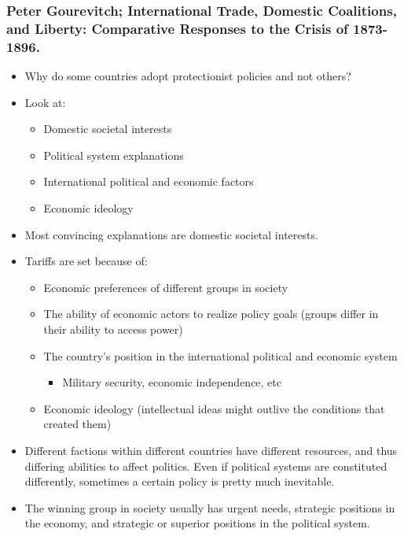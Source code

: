 \documentclass[11pt]{article}
\begin{document}
\subsubsection{Peter Gourevitch; International Trade, Domestic Coalitions, and Liberty:  Comparative Responses to the Crisis of 1873-1896.}
\label{sec:org9d85f0e}
\begin{itemize}
\item Why do some countries adopt protectionist policies and not others?
\item Look at:
\begin{itemize}
\item Domestic societal interests
\item Political system explanations
\item International political and economic factors
\item Economic ideology
\end{itemize}
\item Most convincing explanations are domestic societal interests.
\item Tariffs are set because of:
\begin{itemize}
\item Economic preferences of different groups in society
\item The ability of economic actors to realize policy goals (groups differ in
their ability to access power)
\item The country's position in the international political and economic system
\begin{itemize}
\item Military security, economic independence, etc
\end{itemize}
\item Economic ideology (intellectual ideas might outlive the conditions that
created them)
\end{itemize}
\item Different factions within different countries have different resources, and
thus differing abilities to affect politics. Even if political systems
are constituted differently, sometimes a certain policy is pretty much inevitable.
\item The winning group in society usually has urgent needs, strategic positions in
the economy, and strategic or superior positions in the political system.
\end{itemize}
\end{document}
